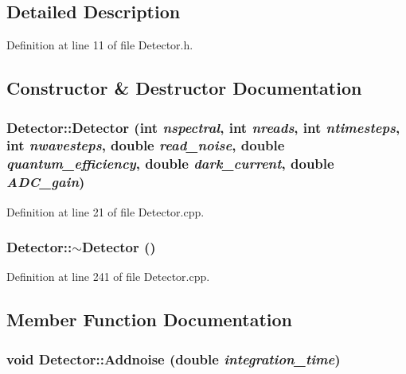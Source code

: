 \subsection{Detailed Description}


Definition at line 11 of file Detector.h.



\subsection{Constructor \& Destructor Documentation}
\hypertarget{classDetector_a59e4a9ab2c51505abae515442940f58d}{
\subsubsection[{Detector}]{\setlength{\rightskip}{0pt plus 5cm}Detector::Detector (int {\em nspectral}, \/  int {\em nreads}, \/  int {\em ntimesteps}, \/  int {\em nwavesteps}, \/  double {\em read\_\-noise}, \/  double {\em quantum\_\-efficiency}, \/  double {\em dark\_\-current}, \/  double {\em ADC\_\-gain})}}
\label{classDetector_a59e4a9ab2c51505abae515442940f58d}


Definition at line 21 of file Detector.cpp.

\hypertarget{classDetector_ae16b7bf62f39cb287927d56ca17663d7}{
\subsubsection[{$\sim$Detector}]{\setlength{\rightskip}{0pt plus 5cm}Detector::$\sim$Detector ()}}
\label{classDetector_ae16b7bf62f39cb287927d56ca17663d7}


Definition at line 241 of file Detector.cpp.



\subsection{Member Function Documentation}
\hypertarget{classDetector_a266b4ed766484ef67e533bd163d5b597}{
\subsubsection[{Addnoise}]{\setlength{\rightskip}{0pt plus 5cm}void Detector::Addnoise (double {\em integration\_\-time})}}
\label{classDetector_a266b4ed766484ef67e533bd163d5b597}


